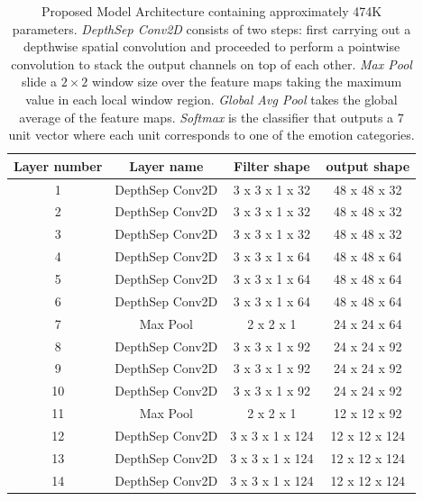 \documentclass[master]{thesis-uestc}
\begin{document}
\begin{table}[ht]
\renewcommand{\arraystretch}{1}
\caption{Proposed Model Architecture containing approximately 474K parameters. \textit{DepthSep Conv2D} consists of two steps: first carrying out a depthwise spatial convolution and proceeded to perform a pointwise convolution to stack the output channels on top of each other. \textit{Max Pool} slide a $2 \times 2$ window size over the feature maps taking the maximum value in each local window region. \textit{Global Avg Pool} takes the global average of the feature maps. \textit{Softmax} is the classifier that outputs a 7 unit vector where each unit corresponds to one of the emotion categories.}
\label{model_arch}
\begin{center}
\begin{tabular}{|c|c|c|c|}
\hline
\textbf{Layer number} & \textbf{Layer name} & \textbf{Filter shape} & \textbf{output shape}\\ \hline
1 & DepthSep Conv2D & 3 x 3 x 1 x 32 & 48 x 48 x 32\\ \hline
2 & DepthSep Conv2D & 3 x 3 x 1 x 32 & 48 x 48 x 32\\ \hline
3 & DepthSep Conv2D & 3 x 3 x 1 x 32 & 48 x 48 x 32\\  \hline

4 & DepthSep Conv2D & 3 x 3 x 1 x 64 & 48 x 48 x 64\\ \hline
5 & DepthSep Conv2D & 3 x 3 x 1 x 64 & 48 x 48 x 64\\ \hline
6 & DepthSep Conv2D & 3 x 3 x 1 x 64 & 48 x 48 x 64\\  \hline

7 & Max Pool & 2 x 2 x 1 & 24 x 24 x 64\\ \hline

8 & DepthSep Conv2D & 3 x 3 x 1 x 92 & 24 x 24 x 92\\ \hline
9 & DepthSep Conv2D & 3 x 3 x 1 x 92 & 24 x 24 x 92\\ \hline
10 & DepthSep Conv2D & 3 x 3 x 1 x 92 & 24 x 24 x 92\\ \hline

11 & Max Pool & 2 x 2 x 1 & 12 x 12 x 92\\ \hline

12 & DepthSep Conv2D & 3 x 3 x 1 x 124 & 12 x 12 x 124\\ \hline
13 & DepthSep Conv2D & 3 x 3 x 1 x 124 & 12 x 12 x 124\\ \hline
14 & DepthSep Conv2D & 3 x 3 x 1 x 124 & 12 x 12 x 124\\ \hline


\end{tabular}
\end{center}
\end{table}
\end{document}
